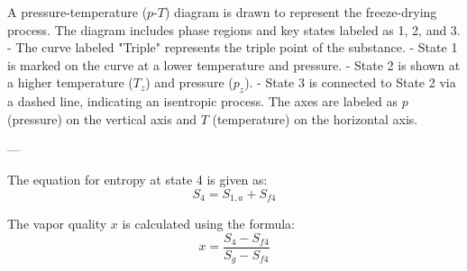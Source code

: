 A pressure-temperature (\(p\)-\(T\)) diagram is drawn to represent the freeze-drying process. The diagram includes phase regions and key states labeled as 1, 2, and 3.  
- The curve labeled "Triple" represents the triple point of the substance.  
- State 1 is marked on the curve at a lower temperature and pressure.  
- State 2 is shown at a higher temperature (\(T_z\)) and pressure (\(p_z\)).  
- State 3 is connected to State 2 via a dashed line, indicating an isentropic process.  
The axes are labeled as \(p\) (pressure) on the vertical axis and \(T\) (temperature) on the horizontal axis.

---

The equation for entropy at state 4 is given as:  
\[
S_4 = S_{1,a} + S_{f4}
\]  

The vapor quality \( x \) is calculated using the formula:  
\[
x = \frac{S_4 - S_{f4}}{S_{g} - S_{f4}}
\]